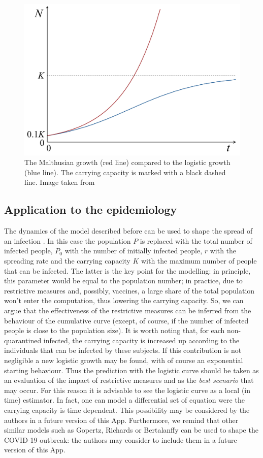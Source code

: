 \documentclass[
12pt, %
a4paper, %
oneside, %
headinclude,footinclude, %
BCOR5mm, %
]{scrartcl}
\begin{document}
\begin{figure}
 \centering
 \includegraphics[width=0.8\linewidth]{Figures/Malthusian_growth_vs_logistic_growth-2.jpg} 
 \caption{The Malthusian growth (red line) compared to the logistic growth (blue line). The carrying capacity is marked with a black dashed line. Image taken from \cite{malthus_vs_logistic}}
 \label{Malthusian_growth_vs_logistic_growth}
\end{figure}

\subsection{Application to the epidemiology}

The dynamics of the model described before can be used to shape the spread of an infection  \cite{serfling1952historical,ma2014estimating}. In this case the population $P$ is replaced with the total number of infected people, $P_{0}$ with the number of initially infected people, $r$ with the spreading rate and the carrying capacity $K$ with the maximum number of people that can be infected. The latter is the key point for the modelling: in principle, this parameter would be equal to the population number; in practice, due to restrictive measures and, possibly, vaccines, a large share of the total population won't enter the computation, thus lowering the carrying capacity. So, we can argue that the effectiveness of the restrictive measures can be inferred from the behaviour of the cumulative curve (except, of course, if the number of infected people is close to the population size). It is worth noting that, for each non-quarantined infected, the carrying capacity is increased up according to the individuals that can be infected by these subjects. If this contribution is not negligible a new logistic growth may be found, with of course an exponential starting behaviour. Thus the prediction with the logistic curve should be taken as an evaluation of the impact of restrictive measures and as the \emph{best scenario} that may occur. For this reason it is advisable to see the logistic curve as a local (in time) estimator. 
In fact, one can model a differential set of equation were the carrying capacity is time dependent. This possibility may be considered  by the authors in a future version of this App. Furthermore, we remind that other similar models such as Gopertz, Richards or Bertalanffy can be used to shape the COVID-19 outbreak\cite{ma2014estimating}: the authors may consider to include them in a future version of this App.
\end{document}
